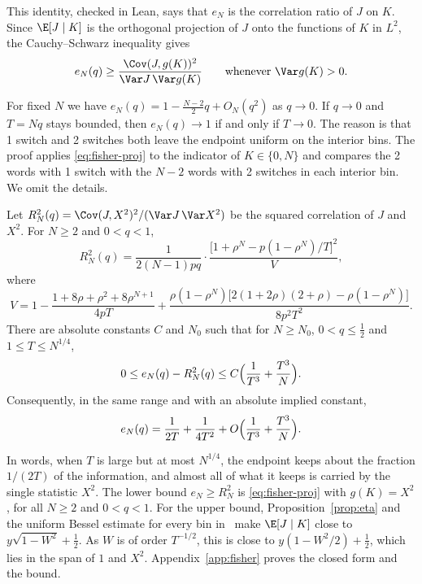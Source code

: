 This identity, checked in Lean, says that $e_N$ is the correlation ratio of
$J$ on $K$. Since $\E[J\mid K]$ is the orthogonal projection of $J$ onto
the functions of $K$ in $L^2$, the Cauchy--Schwarz inequality gives
\begin{equation}\label{eq:fisher-proj}
 e_N(q)\ge\frac{\Cov(J,g(K))^2}{\Var J\,\Var g(K)}
 \qquad\text{whenever }\Var g(K)>0.
\end{equation}

\begin{remark}\label{rem:fisher-small}
For fixed $N$ we have $e_N(q)=1-\frac{N-2}2q+O_N(q^2)$ as $q\to0$. If $q\to0$
and $T=Nq$ stays bounded, then $e_N(q)\to1$ if and only if $T\to0$. The
reason is that 1 switch and 2 switches both leave the endpoint uniform on the
interior bins. The proof applies \eqref{eq:fisher-proj} to the indicator of
$K\in\{0,N\}$ and compares the 2 words with 1 switch with the $N-2$ words
with 2 switches in each interior bin. We omit the details.
\end{remark}

\begin{theorem}\label{thm:fisher}
Let $R^2_N(q)=\Cov(J,X^2)^2/(\Var J\,\Var X^2)$ be the squared correlation
of $J$ and $X^2$. For $N\ge2$ and $0<q<1$,
\[
 R^2_N(q)=\frac1{2(N-1)pq}\cdot
 \frac{\bigl[1+\rho^N-p(1-\rho^N)/T\bigr]^2}{V},
\]
where
\[
 V=1-\frac{1+8\rho+\rho^2+8\rho^{N+1}}{4pT}
 +\frac{\rho(1-\rho^N)\bigl[2(1+2\rho)(2+\rho)-\rho(1-\rho^N)\bigr]}{8p^2T^2}.
\]
There are absolute constants $C$ and $N_0$ such that for $N\ge N_0$,
$0<q\le\frac12$ and $1\le T\le N^{1/4}$,
\[
 0\le e_N(q)-R^2_N(q)\le C\Bigl(\frac1{T^3}+\frac{T^3}N\Bigr).
\]
Consequently, in the same range and with an absolute implied constant,
\[
 e_N(q)=\frac1{2T}+\frac1{4T^2}+O\Bigl(\frac1{T^3}+\frac{T^3}N\Bigr).
\]
\end{theorem}

In words, when $T$ is large but at most $N^{1/4}$, the endpoint keeps about the
fraction $1/(2T)$ of the information, and almost all of what it keeps is carried
by the single statistic $X^2$. The lower bound $e_N\ge R^2_N$ is
\eqref{eq:fisher-proj} with $g(K)=X^2$,
for all $N\ge2$ and $0<q<1$. For the upper bound, Proposition~\ref{prop:eta}
and the uniform Bessel estimate for every bin in~\cite{paperA} make
$\E[J\mid K]$ close to $y\sqrt{1-W^2}+\frac12$. As $W$ is of order
$T^{-1/2}$, this is close to $y(1-W^2/2)+\frac12$, which lies in the span of
$1$ and $X^2$. Appendix~\ref{app:fisher} proves the closed form and the
bound.


